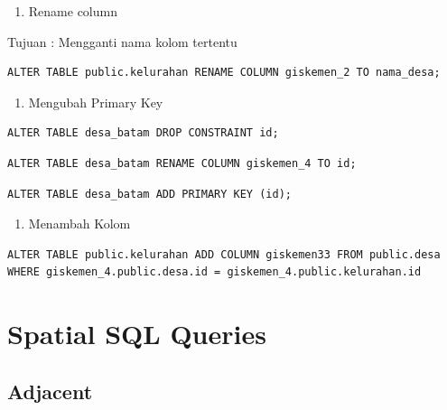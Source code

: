 \documentclass[]{book}
\providecommand{\tightlist}{%
  \setlength{\itemsep}{0pt}\setlength{\parskip}{0pt}}
\begin{document}
\begin{enumerate}
\def\labelenumi{\arabic{enumi}.}
\setcounter{enumi}{1}
\tightlist
\item
  Rename column
\end{enumerate}

Tujuan : Mengganti nama kolom tertentu

\begin{verbatim}
ALTER TABLE public.kelurahan RENAME COLUMN giskemen_2 TO nama_desa;
\end{verbatim}

\begin{enumerate}
\def\labelenumi{\arabic{enumi}.}
\setcounter{enumi}{2}
\tightlist
\item
  Mengubah Primary Key
\end{enumerate}

\begin{verbatim}
ALTER TABLE desa_batam DROP CONSTRAINT id;
\end{verbatim}

\begin{verbatim}
ALTER TABLE desa_batam RENAME COLUMN giskemen_4 TO id;
\end{verbatim}

\begin{verbatim}
ALTER TABLE desa_batam ADD PRIMARY KEY (id);
\end{verbatim}

\begin{enumerate}
\def\labelenumi{\arabic{enumi}.}
\setcounter{enumi}{3}
\tightlist
\item
  Menambah Kolom
\end{enumerate}

\begin{verbatim}
ALTER TABLE public.kelurahan ADD COLUMN giskemen33 FROM public.desa WHERE giskemen_4.public.desa.id = giskemen_4.public.kelurahan.id
\end{verbatim}

\hypertarget{spatial-sql-queries}{%
\section{Spatial SQL Queries}\label{spatial-sql-queries}}

\hypertarget{adjacent}{%
\subsection{Adjacent}\label{adjacent}}
\end{document}
